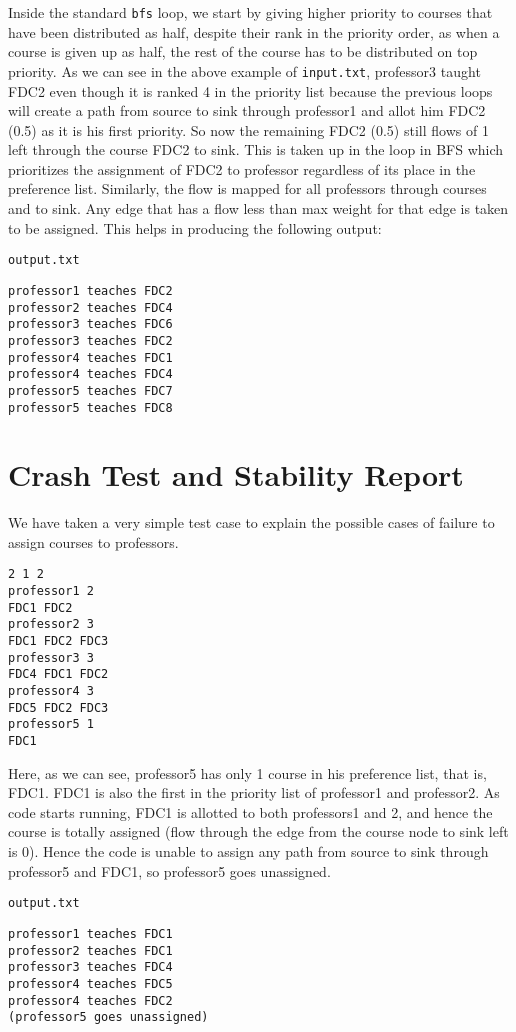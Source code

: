 \documentclass{article}
\begin{document}
Inside the standard \texttt{bfs} loop, we start by giving higher priority to courses that have been distributed as half, despite their rank in the priority order, as when a course is given up as half, the rest of the course has to be distributed on top priority. As we can see in the above example of \texttt{input.txt}, professor3 taught FDC2 even though it is ranked 4 in the priority list because the previous loops will create a path from source to sink through professor1 and allot him FDC2 (0.5) as it is his first priority. So now the remaining FDC2 (0.5) still flows of 1 left through the course FDC2 to sink. This is taken up in the loop in BFS which prioritizes the assignment of FDC2 to professor regardless of its place in the preference list. Similarly, the flow is mapped for all professors through courses and to sink. Any edge that has a flow less than max weight for that edge is taken to be assigned. This helps in producing the following output:

\texttt{output.txt}
\begin{verbatim}
professor1 teaches FDC2
professor2 teaches FDC4
professor3 teaches FDC6
professor3 teaches FDC2
professor4 teaches FDC1
professor4 teaches FDC4
professor5 teaches FDC7
professor5 teaches FDC8
\end{verbatim}

\section*{Crash Test and Stability Report}
We have taken a very simple test case to explain the possible cases of failure to assign courses to professors.

\begin{verbatim}
2 1 2
professor1 2
FDC1 FDC2
professor2 3
FDC1 FDC2 FDC3
professor3 3
FDC4 FDC1 FDC2
professor4 3
FDC5 FDC2 FDC3
professor5 1
FDC1
\end{verbatim}

Here, as we can see, professor5 has only 1 course in his preference list, that is, FDC1. FDC1 is also the first in the priority list of professor1 and professor2. As code starts running, FDC1 is allotted to both professors1 and 2, and hence the course is totally assigned (flow through the edge from the course node to sink left is 0). Hence the code is unable to assign any path from source to sink through professor5 and FDC1, so professor5 goes unassigned.

\texttt{output.txt}
\begin{verbatim}
professor1 teaches FDC1
professor2 teaches FDC1
professor3 teaches FDC4
professor4 teaches FDC5
professor4 teaches FDC2
(professor5 goes unassigned)
\end{verbatim}
\end{document}
